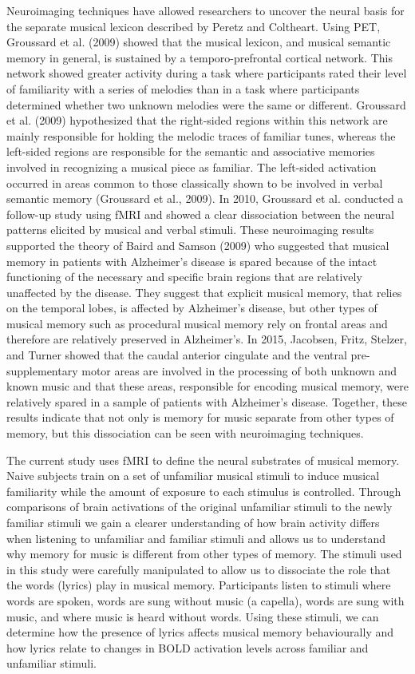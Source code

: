 \documentclass[12pt,letterpaper]{report}
\begin{document}
Neuroimaging techniques have allowed researchers to uncover the neural basis for the separate musical lexicon described by Peretz and Coltheart. Using PET, Groussard et al. (2009) showed that the musical lexicon, and musical semantic memory in general, is sustained by a temporo-prefrontal cortical network. This network showed greater activity during a task where participants rated their level of familiarity with a series of melodies than in a task where participants determined whether two unknown melodies were the same or different. Groussard et al. (2009) hypothesized that the right-sided regions within this network are mainly responsible for holding the melodic traces of familiar tunes, whereas the left-sided regions are responsible for the semantic and associative memories involved in recognizing a musical piece as familiar. The left-sided activation occurred in areas common to those classically shown to be involved in verbal semantic memory (Groussard et al., 2009). In 2010, Groussard et al. conducted a follow-up study using fMRI and showed a clear dissociation between the neural patterns elicited by musical and verbal stimuli. These neuroimaging results supported the theory of Baird and Samson (2009) who suggested that musical memory in patients with Alzheimer's disease is spared because of the intact functioning of the necessary and specific brain regions that are relatively unaffected by the disease. They suggest that explicit musical memory, that relies on the temporal lobes, is affected by Alzheimer's disease, but other types of musical memory such as procedural musical memory rely on frontal areas and therefore are relatively preserved in Alzheimer's. In 2015, Jacobsen, Fritz, Stelzer, and Turner showed that the caudal anterior cingulate and the ventral pre-supplementary motor areas are involved in the processing of both unknown and known music and that these areas, responsible for encoding musical memory, were relatively spared in a sample of patients with Alzheimer's disease. Together, these results indicate that not only is memory for music separate from other types of memory, but this dissociation can be seen with neuroimaging techniques. 

The current study uses fMRI to define the neural substrates of musical memory. 
Naive subjects train on a set of unfamiliar musical stimuli to induce musical familiarity while the amount of exposure to each stimulus is controlled.
Through comparisons of brain activations of the original unfamiliar stimuli to the newly familiar stimuli we gain a clearer understanding of how brain activity differs when listening to unfamiliar and familiar stimuli and allows us to understand why memory for music is different from other types of memory. 
The stimuli used in this study were carefully manipulated to allow us to dissociate the role that the words (lyrics) play in musical memory. 
Participants listen to stimuli where words are spoken, words are sung without music (a capella), words are sung with music, and where music is heard without words. 
Using these stimuli, we can determine how the presence of lyrics affects musical memory behaviourally and how lyrics relate to changes in BOLD activation levels across familiar and unfamiliar stimuli. 
\end{document}
